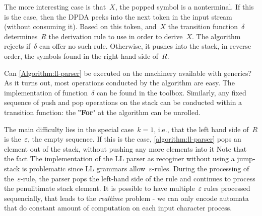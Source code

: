The more interesting case is that~$X$, the popped symbol
  is a nonterminal.
If this is the case, then the DPDA peeks into the next token in the input
  stream (without consuming it).
Based on this token, and~$X$ the transition function~$δ$
  determines~$R$ the derivation rule to use in order to derive~$X$.
The algorithm rejects if~$δ$ can offer no such rule.
Otherwise, it pushes into the stack, in reverse order, the symbols
  found in the right hand side of~$R$.

Can \cref{Algorithm:ll-parser} be executed on the machinery
  available with \Java generics?
As it turns out, most operations conducted by the algorithm
  are easy.
The implementation of function~$δ$ can
  be found in the toolbox.
Similarly, any fixed sequence of push and pop
  operations on the stack can be conducted within a \Java
  transition function:
  the ‟\textbf{For}" at the algorithm can be unrolled.

The main difficulty lies in the special case~$k=1$,
  i.e., that the left hand side of~$R$ is the~$ε$, the empty
    sequence.
If this is the case, \cref{algorithm:ll-parser}
  pops an element out of the stack, without pushing any more elements into it
Note that the fact
The implementation of the LL parser as recoginer without using
  a jump-stack is problematic since LL grammars allow~$ε$-rules.
During the processing of the~$ε$-rule, the parser pops the
  left-hand side of the rule and continues to process the penulitimate
  stack element.
It is possible to have multiple~$ε$ rules processed sequencially,
  that leads to the \textit{realtime} problem - we can only encode
  automata that do constant amount of computation on each input character
  process.

